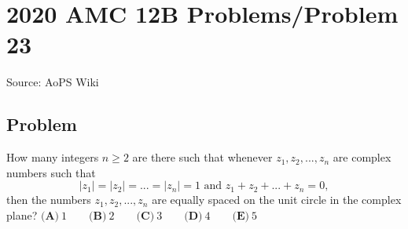 \documentclass[12pt]{article}
\begin{document}
\section*{{2020 AMC 12B Problems/Problem 23}}
Source: AoPS Wiki

\subsection*{Problem}
How many integers $n \geq 2$ are there such that whenever $z_1, z_2, ..., z_n$ are complex numbers such that \[|z_1| = |z_2| = ... = |z_n| = 1 \text{ and } z_1 + z_2 + ... + z_n = 0,\] then the numbers $z_1, z_2, ..., z_n$ are equally spaced on the unit circle in the complex plane? $\textbf{(A)}\ 1 \qquad\textbf{(B)}\ 2 \qquad\textbf{(C)}\ 3 \qquad\textbf{(D)}\ 4 \qquad\textbf{(E)}\ 5$
\end{document}

